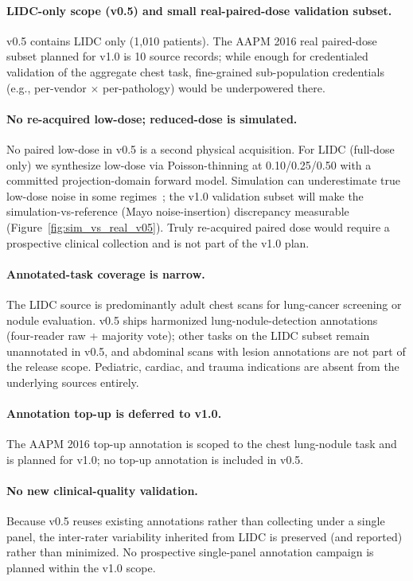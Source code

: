 \documentclass[twoside,11pt]{article}
\begin{document}
\paragraph{LIDC-only scope (v0.5) and small real-paired-dose validation subset.} v0.5 contains LIDC only (1{,}010 patients). The AAPM 2016 real paired-dose subset planned for v1.0 is 10 source records; while enough for credentialed validation of the aggregate chest task, fine-grained sub-population credentials (e.g., per-vendor $\times$ per-pathology) would be underpowered there.

\paragraph{No re-acquired low-dose; reduced-dose is simulated.} No paired low-dose in v0.5 is a second physical acquisition. For LIDC (full-dose only) we synthesize low-dose via Poisson-thinning at 0.10/0.25/0.50 with a committed projection-domain forward model. Simulation can underestimate true low-dose noise in some regimes~\citep{wang2020deeplearningreview}; the v1.0 validation subset will make the simulation-vs-reference (Mayo noise-insertion) discrepancy measurable (Figure~\ref{fig:sim_vs_real_v05}). Truly re-acquired paired dose would require a prospective clinical collection and is not part of the v1.0 plan.

\paragraph{Annotated-task coverage is narrow.} The LIDC source is predominantly adult chest scans for lung-cancer screening or nodule evaluation. v0.5 ships harmonized lung-nodule-detection annotations (four-reader raw + majority vote); other tasks on the LIDC subset remain unannotated in v0.5, and abdominal scans with lesion annotations are not part of the release scope. Pediatric, cardiac, and trauma indications are absent from the underlying sources entirely.

\paragraph{Annotation top-up is deferred to v1.0.} The AAPM 2016 top-up annotation is scoped to the chest lung-nodule task and is planned for v1.0; no top-up annotation is included in v0.5.

\paragraph{No new clinical-quality validation.} Because v0.5 reuses existing annotations rather than collecting under a single panel, the inter-rater variability inherited from LIDC is preserved (and reported) rather than minimized. No prospective single-panel annotation campaign is planned within the v1.0 scope.
\end{document}
